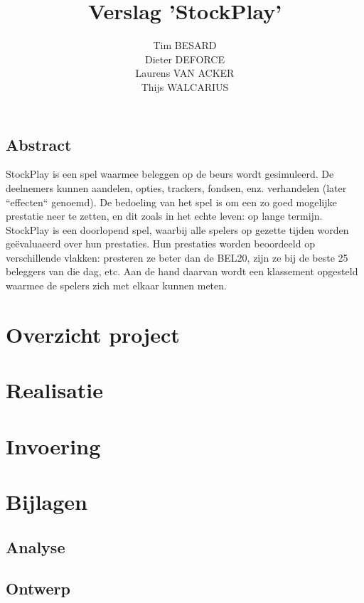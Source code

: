 \documentclass[a4paper,oneside,final]{memoir}
\title{Verslag 'StockPlay'}
\author{
Tim BESARD\\
Dieter DEFORCE\\
Laurens VAN ACKER\\
Thijs WALCARIUS
}
\begin{document}
\maketitle
{}
\tableofcontents
{}


%
%

\chapter*{Abstract}
StockPlay is een spel waarmee beleggen op de beurs wordt gesimuleerd. De deelnemers kunnen aandelen, opties, trackers, fondsen, enz. verhandelen (later ``effecten`` genoemd). De bedoeling van het spel is om een zo goed mogelijke prestatie neer te zetten, en dit zoals in het echte leven: op lange termijn. StockPlay is een doorlopend spel, waarbij alle spelers op gezette tijden worden ge\"evaluaeerd over hun prestaties. Hun prestaties worden beoordeeld op verschillende vlakken: presteren ze beter dan de BEL20, zijn ze bij de beste 25 beleggers van die dag, etc. Aan de hand daarvan wordt een klassement opgesteld waarmee de spelers zich met elkaar kunnen meten.

\part{Overzicht project}
\label{pt:overzicht}


\part{Realisatie}
\label{pt:realisatie}


\part{Invoering}
\label{pt:invoering}


%
%

\part{Bijlagen}
\label{pt:bijlagen}
\appendix
\chapter{Analyse}
\label{pt:analyse}


\chapter{Ontwerp}
\label{chap:ontwerp}

\end{document}
